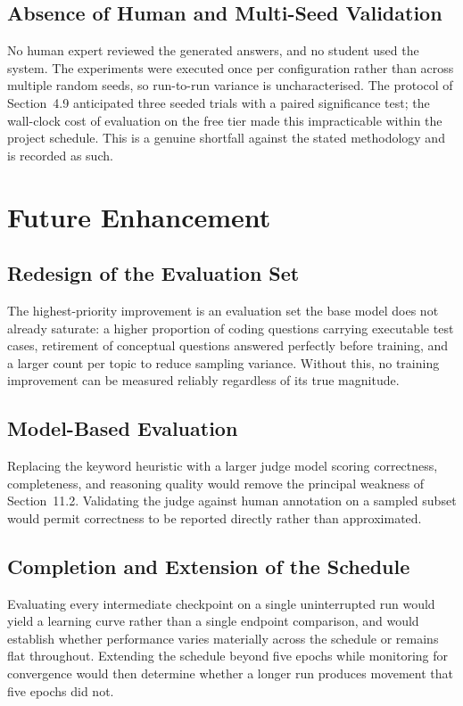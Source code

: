 \documentclass[12pt,a4paper]{report}
\begin{document}
\section{Absence of Human and Multi-Seed Validation}

No human expert reviewed the generated answers, and no student used the system. The experiments were executed once per configuration rather than across multiple random seeds, so run-to-run variance is uncharacterised. The protocol of Section~4.9 anticipated three seeded trials with a paired significance test; the wall-clock cost of evaluation on the free tier made this impracticable within the project schedule. This is a genuine shortfall against the stated methodology and is recorded as such.

\chapter{Future Enhancement}

\section{Redesign of the Evaluation Set}

The highest-priority improvement is an evaluation set the base model does not already saturate: a higher proportion of coding questions carrying executable test cases, retirement of conceptual questions answered perfectly before training, and a larger count per topic to reduce sampling variance. Without this, no training improvement can be measured reliably regardless of its true magnitude.

\section{Model-Based Evaluation}

Replacing the keyword heuristic with a larger judge model scoring correctness, completeness, and reasoning quality would remove the principal weakness of Section~11.2. Validating the judge against human annotation on a sampled subset would permit correctness to be reported directly rather than approximated.

\section{Completion and Extension of the Schedule}

Evaluating every intermediate checkpoint on a single uninterrupted run would yield a learning curve rather than a single endpoint comparison, and would establish whether performance varies materially across the schedule or remains flat throughout. Extending the schedule beyond five epochs while monitoring for convergence would then determine whether a longer run produces movement that five epochs did not.
\end{document}
